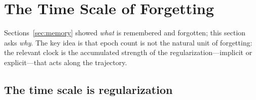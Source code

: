 \documentclass{article}
\newcommand{\sigw}{\sigma_w}
\begin{document}

\vspace{-0.5em}
\section{The Time Scale of Forgetting}
\label{sec:timescales}
Sections~\ref{sec:memory} showed \emph{what} is remembered
and forgotten; this section asks \emph{why}.  The key idea is that epoch count
is not the natural unit of forgetting: the relevant clock is the accumulated
strength of the regularization---implicit or explicit---that acts along the
trajectory.
\vspace{-0.5em}
\subsection{The time scale is regularization}
\end{document}
